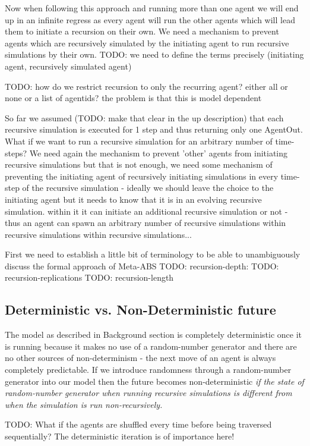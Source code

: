 Now when following this approach and running more than one agent we will end up in an infinite regress as every agent will run the other agents which will lead them to initiate a recursion on their own. We need a mechanism to prevent agents which are recursively simulated by the initiating agent to run recursive simulations by their own. TODO: we need to define the terms precisely (initiating agent, recursively simulated agent)

TODO:  how do we restrict recursion to only the recurring agent? either all or none or a list of agentids? the problem is that this is model dependent

So far we assumed (TODO: make that clear in the up description) that each recursive simulation is executed for 1 step and thus returning only one AgentOut. What if we want to run a recursive simulation for an arbitrary number of time-steps? We need again the mechanism to prevent 'other' agents from initiating recursive simulations but that is not enough, we need some mechanism of preventing the initiating agent of recursively initiating simulations in every time-step of the recursive simulation - ideally we should leave the choice to the initiating agent but it needs to know that it is in an evolving recursive simulation. within it it can initiate an additional recursive simulation or not - thus an agent can spawn an arbitrary number of recursive simulations within recursive simulations within recursive simulations...

First we need to establish a little bit of terminology to be able to unambiguously discuss the formal approach of Meta-ABS
TODO: recursion-depth:
TODO: recursion-replications
TODO: recursion-length

\subsection{Deterministic vs. Non-Deterministic future}
The model as described in Background section is completely deterministic once it is running because it makes no use of a random-number generator and there are no other sources of non-determinism - the next move of an agent is always completely predictable. If we introduce randomness through a random-number generator into our model then the future becomes non-deterministic \textit{if the state of random-number generator when running recursive simulations is different from when the simulation is run non-recursively.}

TODO: What if the agents are shuffled every time before being traversed sequentially? The deterministic iteration is of importance here!

